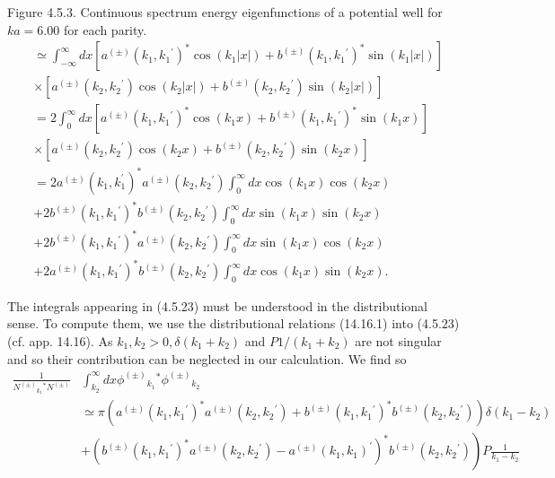 \documentclass{article}
\begin{document}
Figure 4.5.3. Continuous spectrum energy eigenfunctions of a potential well for $k a=6.00$ for each parity.
$$
\begin{aligned}
& \simeq \int_{-\infty}^{\infty} d x\left[a^{( \pm)}\left(k_{1}, k_{1}{ }^{\prime}\right)^{*} \cos \left(k_{1}|x|\right)+b^{( \pm)}\left(k_{1}, k_{1}{ }^{\prime}\right)^{*} \sin \left(k_{1}|x|\right)\right] \\
& \times\left[a^{( \pm)}\left(k_{2}, k_{2}{ }^{\prime}\right) \cos \left(k_{2}|x|\right)+b^{( \pm)}\left(k_{2}, k_{2}{ }^{\prime}\right) \sin \left(k_{2}|x|\right)\right] \\
& =2 \int_{0}^{\infty} d x\left[a^{( \pm)}\left(k_{1}, k_{1}{ }^{\prime}\right)^{*} \cos \left(k_{1} x\right)+b^{( \pm)}\left(k_{1}, k_{1}{ }^{\prime}\right)^{*} \sin \left(k_{1} x\right)\right] \\
& \times\left[a^{( \pm)}\left(k_{2}, k_{2}{ }^{\prime}\right) \cos \left(k_{2} x\right)+b^{( \pm)}\left(k_{2}, k_{2}{ }^{\prime}\right) \sin \left(k_{2} x\right)\right] \\
& =2 a^{( \pm)}\left(k_{1}, k_{1}^{\prime}\right)^{*} a^{( \pm)}\left(k_{2}, k_{2}{ }^{\prime}\right) \int_{0}^{\infty} d x \cos \left(k_{1} x\right) \cos \left(k_{2} x\right) \\
& +2 b^{( \pm)}\left(k_{1}, k_{1}{ }^{\prime}\right)^{*} b^{( \pm)}\left(k_{2}, k_{2}{ }^{\prime}\right) \int_{0}^{\infty} d x \sin \left(k_{1} x\right) \sin \left(k_{2} x\right) \\
& +2 b^{( \pm)}\left(k_{1}, k_{1}{ }^{\prime}\right)^{*} a^{( \pm)}\left(k_{2}, k_{2}{ }^{\prime}\right) \int_{0}^{\infty} d x \sin \left(k_{1} x\right) \cos \left(k_{2} x\right) \\
& +2 a^{( \pm)}\left(k_{1}, k_{1}{ }^{\prime}\right)^{*} b^{( \pm)}\left(k_{2}, k_{2}{ }^{\prime}\right) \int_{0}^{\infty} d x \cos \left(k_{1} x\right) \sin \left(k_{2} x\right) .
\end{aligned}
$$

The integrals appearing in (4.5.23) must be understood in the distributional sense. To compute them, we use the distributional relations (14.16.1) into (4.5.23) (cf. app. 14.16). As $k_{1}, k_{2}>0, \delta\left(k_{1}+k_{2}\right)$ and $P 1 /\left(k_{1}+k_{2}\right)$ are not singular and so their contribution can be neglected in our calculation. We find so
$$
\begin{align*}
\frac{1}{N^{( \pm)}{ }_{k_{1}}{ }^{*} N^{( \pm)}} & \int_{k_{2}}^{\infty} d x \phi^{( \pm)}{ }_{k_{1}}{ }^{*} \phi^{( \pm)}{ }_{k_{2}}  \tag{4.5.24}\\
& \simeq \pi\left(a^{( \pm)}\left(k_{1}, k_{1}{ }^{\prime}\right)^{*} a^{( \pm)}\left(k_{2}, k_{2}{ }^{\prime}\right)+b^{( \pm)}\left(k_{1}, k_{1}{ }^{\prime}\right)^{*} b^{( \pm)}\left(k_{2}, k_{2}{ }^{\prime}\right)\right) \delta\left(k_{1}-k_{2}\right) \\
& \left.+\left(b^{( \pm)}\left(k_{1}, k_{1}{ }^{\prime}\right)^{*} a^{( \pm)}\left(k_{2}, k_{2}{ }^{\prime}\right)-a^{( \pm)}\left(k_{1}, k_{1}\right)^{\prime}\right)^{*} b^{( \pm)}\left(k_{2}, k_{2}{ }^{\prime}\right)\right) P \frac{1}{k_{1}-k_{2}}
\end{align*}
$$
\end{document}
